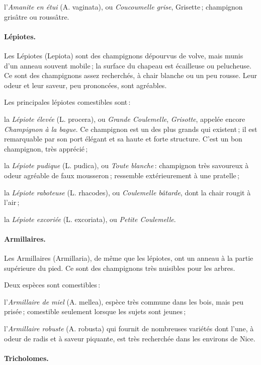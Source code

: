 l'\textit{Amanite en étui} (A. vaginata), ou \textit{Coucoumelle grise},
Grisette ; champignon grisâtre ou roussâtre.

\paragraph{Lépiotes.}

Les Lépiotes (Lepiota) sont des champignons dépourvus de volve, mais munis
d'un anneau souvent mobile ; la surface du chapeau est écailleuse ou pelucheuse.
Ce sont des champignons assez recherchés, à chair blanche ou un peu rousse.
Leur odeur et leur saveur, peu prononcées, sont agréables.

Les principales lépiotes comestibles sont :

la \textit{Lépiote élevée} (L. procera), ou \textit{Grande Coulemelle},
\textit{Grisotte}, appelée encore \textit{Champignon à la bague}. Ce champignon
est un des plus grands qui existent ; il est remarquable par son port élégant
et sa haute et forte structure. C'est un bon champignon, très apprécié ;

la \textit{Lépiote pudique} (L. pudica), ou \textit{Toute blanche} : champignon
très savoureux à odeur agréable de faux mousseron ; ressemble extérieurement
à une pratelle ;

la \textit{Lépiote raboteuse} (L. rhacodes), ou \textit{Coulemelle bâtarde},
dont la chair rougit à l'air ;

la \textit{Lépiote excoriée} (L. excoriata), ou \textit{Petite Coulemelle}.

\paragraph{Armillaires.}

Les Armillaires (Armillaria), de même que les lépiotes, ont un anneau à la
partie supérieure du pied. Ce sont des champignons très nuisibles pour les
arbres.

Deux espèces sont comestibles :

l'\textit{Armillaire de miel} (A. mellea), espèce très commune dans les bois,
mais peu prisée ; comestible seulement lorsque les sujets sont jeunes ;

l'\textit{Armillaire robuste} (A. robusta) qui fournit de nombreuses variétés
dont l’une, à odeur de radis et à saveur piquante, est très recherchée dans les
environs de Nice.

\paragraph{Tricholomes.}

